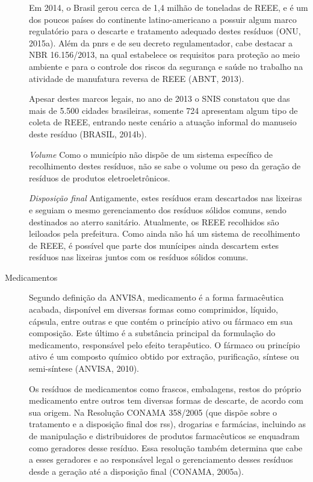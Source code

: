 \begin{description}
	Em 2014, o Brasil gerou cerca de 1,4 milhão de toneladas de REEE, e é um dos poucos países do continente latino-americano a possuir algum marco regulatório para o descarte e tratamento adequado destes resíduos (ONU, 2015a). Além da \gls{pnrs} e de seu decreto regulamentador, cabe destacar a NBR 16.156/2013, na qual estabelece os requisitos para proteção ao meio ambiente e para o controle dos riscos da segurança e saúde no trabalho na atividade de manufatura reversa de REEE (ABNT, 2013). 
	
	Apesar destes marcos legais, no ano de 2013 o SNIS constatou que das mais de 5.500 cidades brasileiras, somente 724 apresentam algum tipo de coleta de REEE, entrando neste cenário a atuação informal do manuseio deste resíduo (BRASIL, 2014b).
	
		\subitem \textit{Volume}
		Como o município não dispõe de um sistema específico de recolhimento destes resíduos, não se sabe o volume ou peso da geração de resíduos de produtos eletroeletrônicos.
	
		\subitem \textit{Disposição final}
		Antigamente, estes resíduos eram descartados nas lixeiras e seguiam o mesmo gerenciamento dos resíduos sólidos comuns, sendo destinados ao aterro sanitário. Atualmente, os REEE recolhidos são leiloados pela prefeitura.
		Como ainda não há um sistema de recolhimento de REEE, é possível que parte dos munícipes ainda descartem estes resíduos nas lixeiras juntos com os resíduos sólidos comuns.
	
	\item[Medicamentos] Segundo definição da ANVISA, medicamento é a forma farmacêutica acabada, disponível em diversas formas como comprimidos, líquido, cápsula, entre outras e que contém o princípio ativo ou fármaco em sua composição. Este último é a substância principal da formulação do medicamento, responsável pelo efeito terapêutico. O fármaco ou princípio ativo é um composto químico obtido por extração, purificação, síntese ou semi-síntese (ANVISA, 2010).
	
	Os resíduos de medicamentos como frascos, embalagens, restos do próprio medicamento entre outros tem diversas formas de descarte, de acordo com sua origem. Na Resolução CONAMA 358/2005 (que dispõe sobre o tratamento e a disposição final dos \gls{rss}), drogarias e farmácias, incluindo as de manipulação e distribuidores de produtos farmacêuticos se enquadram como geradores desse resíduo. Essa resolução também determina que cabe a esses geradores e ao responsável legal o gerenciamento desses resíduos desde a geração até a disposição final (CONAMA, 2005a).
	

\end{description}
